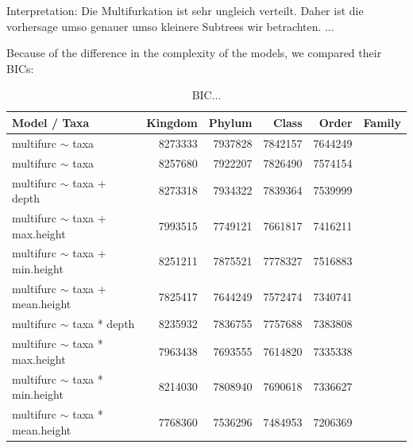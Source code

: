         Interpretation: Die Multifurkation ist sehr ungleich verteilt. Daher ist die vorhersage umso 
          genauer umso kleinere Subtrees wir betrachten. ...
        
        Because of the difference in the complexity of the models, we compared their BICs:
        \begin{table}[h]
          \begin{center}
            \begin{tabular}{ |l|r|r|r|r|r| }
              \hline
              Model / Taxa & Kingdom & Phylum & Class & Order & Family \\
              \hline \hline
              multifurc $\sim$ taxa & 8273333 & \cellcolor{green!15}7937828 & \cellcolor{green!20}7842157 & \cellcolor{green!30}7644249 \\
              multifurc $\sim$ taxa & 8257680 & \cellcolor{green!15}7922207 & \cellcolor{green!20}7826490 & \cellcolor{green!35}7574154 \\
              \hline
              multifurc $\sim$ taxa + depth & 8273318 & \cellcolor{green!15}7934322 & \cellcolor{green!20}7839364 & \cellcolor{green!35}7539999 \\
              multifurc $\sim$ taxa + max.height & \cellcolor{green!15}7993515 & \cellcolor{green!25}7749121 & \cellcolor{green!30}7661817 & \cellcolor{green!40}7416211 \\
              multifurc $\sim$ taxa + min.height & 8251211 & \cellcolor{green!20}7875521  & \cellcolor{green!25}7778327 & \cellcolor{green!35}7516883 \\
              multifurc $\sim$ taxa + mean.height & \cellcolor{green!20}7825417 & \cellcolor{green!30}7644249 & \cellcolor{green!35}7572474 & \cellcolor{green!45}7340741 \\
              \hline
              multifurc $\sim$ taxa * depth & 8235932 & \cellcolor{green!20}7836755 & \cellcolor{green!25}7757688 & \cellcolor{green!45}7383808 \\
              multifurc $\sim$ taxa * max.height & \cellcolor{green!15}7963438 & \cellcolor{green!30}7693555 & \cellcolor{green!30}7614820 & \cellcolor{green!45}7335338 \\
              multifurc $\sim$ taxa * min.height & 8214030 & \cellcolor{green!20}7808940 & \cellcolor{green!30}7690618 & \cellcolor{green!45}7336627\\
              multifurc $\sim$ taxa * mean.height & \cellcolor{green!25}7768360 & \cellcolor{green!35}7536296 & \cellcolor{green!50}7484953 & \cellcolor{green!50}7206369 \\
              \hline
            \end{tabular} 
          \end{center}
          \caption{BIC...}
          \label{table:...} 
        \end{table}


